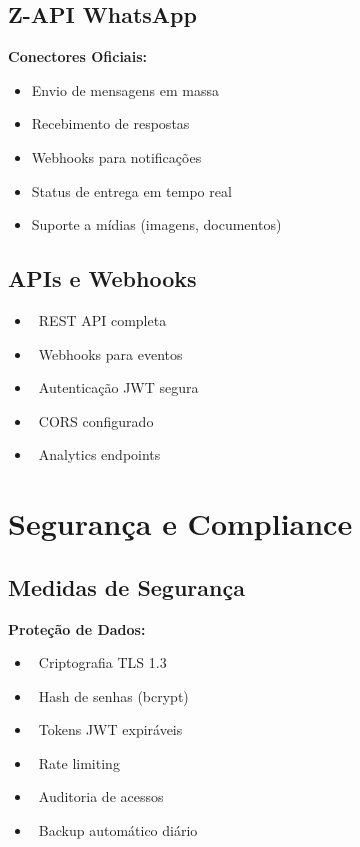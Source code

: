 \documentclass[11pt,a4paper]{article}
\newcommand{\sectiontitle}[1]{\section{\color{oraldentsblue}#1}}
\begin{document}
\subsection{Z-API WhatsApp}
\begin{tcolorbox}[colback=green!5!white,colframe=successgreen]
\textbf{Conectores Oficiais:}
\begin{itemize}
    \item Envio de mensagens em massa
    \item Recebimento de respostas
    \item Webhooks para notificações
    \item Status de entrega em tempo real
    \item Suporte a mídias (imagens, documentos)
\end{itemize}
\end{tcolorbox}

\subsection{APIs e Webhooks}
\begin{itemize}
    \item \faExchangeAlt\ REST API completa
    \item \faBell\ Webhooks para eventos
    \item \faKey\ Autenticação JWT segura
    \item \faShield\ CORS configurado
    \item \faChartBar\ Analytics endpoints
\end{itemize}

\sectiontitle{Segurança e Compliance}

\subsection{Medidas de Segurança}
\begin{tcolorbox}[colback=red!5!white,colframe=red!70!black]
\textbf{Proteção de Dados:}
\begin{itemize}
    \item \faLock\ Criptografia TLS 1.3
    \item \faKey\ Hash de senhas (bcrypt)
    \item \faUserSecret\ Tokens JWT expiráveis
    \item \faShieldAlt\ Rate limiting
    \item \faEye\ Auditoria de acessos
    \item \faDatabase\ Backup automático diário
\end{itemize}
\end{tcolorbox}
\end{document}
